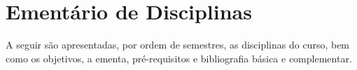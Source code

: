 

\section{Ementário de Disciplinas}\label{sec:ED}

A seguir são apresentadas, por ordem de semestres, as disciplinas do curso, bem como os objetivos, a ementa, pré-requisitos e bibliografia básica e complementar. %

\singlespacing

























